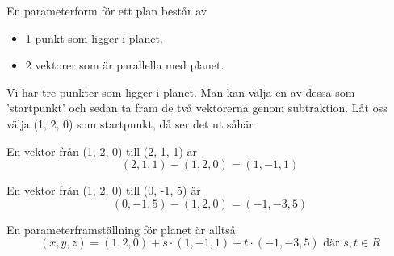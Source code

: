 \documentclass[../../main.tex]{subfiles}
\begin{document}
\begin{solution}{9}
En parameterform för ett plan består av
\begin{itemize}
    \item 1 punkt som ligger i planet.
    \item 2 vektorer som är parallella med planet.
\end{itemize}

Vi har tre punkter som ligger i planet. Man kan välja en av dessa som 'startpunkt' och sedan ta fram de två vektorerna genom subtraktion. Låt oss välja (1, 2, 0) som startpunkt, då ser det ut såhär

\begin{center}
\end{center}

En vektor från (1, 2, 0) till (2, 1, 1) är
\[(2, 1, 1) - (1, 2, 0) = (1, -1, 1)\]

En vektor från (1, 2, 0) till (0, -1, 5) är
\[(0, -1, 5) - (1, 2, 0) = (-1, -3, 5)\]

En parameterframställning för planet är alltså
\[(x, y, z) = (1, 2, 0) + s \cdot (1, -1, 1) + t \cdot (-1, -3, 5) \text{ där } s, t \in R\]

\end{solution}
\end{document}
